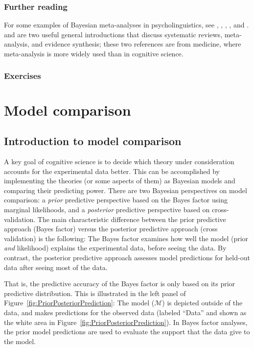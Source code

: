 \documentclass[12pt,]{krantz}
\theoremstyle{definition}
\theoremstyle{definition}
\theoremstyle{definition}
\theoremstyle{remark}
\begin{document}
\section{Further reading}\label{further-reading-5}

For some examples of Bayesian meta-analyses in psycholinguistics, see
\citet{vasishthProcessingChineseRelative2013},
\citet{JaegerEngelmannVasishth2017}, \citet{NicenboimRoettgeretal},
\citet{nicenboim_vasishth_rosler_2020}, and \citet{BuerkiEtAl2020}.
\citet{sutton2012evidence} and \citet{cochrane} are two useful general
introductions that discuss systematic reviews, meta-analysis, and
evidence synthesis; these two references are from medicine, where
meta-analysis is more widely used than in cognitive science.

\section{Exercises}\label{exercises-4}

\part{Model comparison}\label{part-model-comparison}

\chapter{Introduction to model comparison}\label{ch:comparison}

A key goal of cognitive science is to decide which theory under
consideration accounts for the experimental data better. This can be
accomplished by implementing the theories (or some aspects of them) as
Bayesian models and comparing their predicting power. There are two
Bayesian perspectives on model comparison: a \emph{prior} predictive
perspective based on the Bayes factor using marginal likelihoods, and a
\emph{posterior} predictive perspective based on cross-validation. The
main characteristic difference between the prior predictive approach
(Bayes factor) versus the posterior predictive approach (cross
validation) is the following: The Bayes factor examines how well the
model (prior \emph{and} likelihood) explains the experimental data,
before seeing the data. By contrast, the posterior predictive approach
assesses model predictions for held-out data after seeing most of the
data.

That is, the predictive accuracy of the Bayes factor is only based on
its prior predictive distribution. This is illustrated in the left panel
of Figure~\ref{fig:PriorPosteriorPrediction}: The model
(\(\mathcal{M}\)) is depicted outside of the data, and makes predictions
for the observed data (labeled ``Data'' and shown as the white area in
Figure~\ref{fig:PriorPosteriorPrediction}). In Bayes factor analyses,
the prior model predictions are used to evaluate the support that the
data give to the model.
\end{document}
